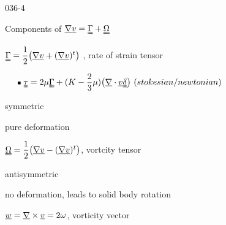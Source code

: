\begin{mitframe}{036-4}
\begin{listone}
	\item Components of $\gradop\uline{\vvel}=\straintens+
    \uuline{\mpc}$
    \begin{listtwo}
    	\item $\straintens=\dfrac{1}{2}\big(\gradop\uline{\vvel}+(\gradop\uline{\vvel})^t\big)$ , rate of strain tensor
        	
               
$\tab\rule[.1ex]{.75ex}{.75ex}~\uuline{\torque}=2\chempot\straintens+(\dilfac-\dfrac{2}{3}\chempot)\big(\gradop\cdot\uline{\vvel}\uuline{\blthick}\big)~ (stokesian/newtonian)$
                \begin{listthree}
                    \item symmetric
                    \item pure deformation
                \end{listthree}
   \item $\uuline{\mpc}=\dfrac{1}{2}\big(\gradop\uline{\vvel}-(\gradop\uline{\vvel})^t\big)$, vortcity tensor
   		\begin{listthree}
        	\item antisymmetric
            \item no deformation, leads to solid body rotation
            \item $\vort=\gradop\times\uline{\vvel}=2\omega $, vorticity vector
        \end{listthree}
    \end{listtwo}
\end{listone}        
\end{mitframe}